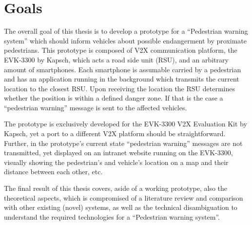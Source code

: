 



\section{Goals}
The overall goal of this thesis is to develop a prototype for a ``Pedestrian warning system'' which should inform vehicles about possible endangerment by proximate pedestrians. This prototype is composed of V2X communication platform, the EVK-3300 by Kapsch, which acts a road side unit (RSU), and an arbitrary amount of smartphones. Each smartphone is assumable carried by a pedestrian and has an application running in the background which transmits the current location to the closest RSU. Upon receiving the location the RSU determines whether the position is within a defined danger zone. If that is the case a ``pedestrian warning'' message is sent to the affected vehicles.

The prototype is exclusively developed for the EVK-3300 V2X Evaluation Kit by Kapsch, yet a port to a different V2X platform should be straightforward. Further, in the prototype's current state ``pedestrian warning'' messages are not transmitted, yet displayed on an intranet website running on the EVK-3300, visually showing the pedestrian's and vehicle's location on a map and their distance between each other, etc.

The final result of this thesis covers, aside of a working prototype, also the theoretical aspects, which is compromised of a literature review and comparison with other existing (novel) systems, as well as the technical disambiguation to understand the required technologies for a ``Pedestrian warning system''.

